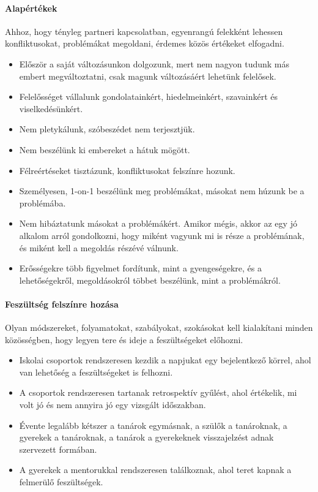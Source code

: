 \paragraph{Alapértékek}
Ahhoz, hogy tényleg partneri kapcsolatban, egyenrangú felekként lehessen konfliktusokat, problémákat megoldani, érdemes közös értékeket elfogadni.
\begin{itemize}
      \item Először a saját változásunkon dolgozunk, mert nem nagyon tudunk más embert megváltoztatni, csak magunk változásáért lehetünk felelősek.
      \item Felelősséget vállalunk gondolatainkért, hiedelmeinkért, szavainkért és viselkedésünkért.
      \item Nem pletykálunk, szóbeszédet nem terjesztjük.
      \item Nem beszélünk ki embereket a hátuk mögött.
      \item Félreértéseket tisztázunk, konfliktusokat felszínre hozunk.
      \item Személyesen, 1-on-1 beszélünk meg problémákat, másokat
        nem\linebreak
        húzunk be a problémába.
      \item Nem hibáztatunk másokat a problémákért. Amikor mégis, akkor az egy jó alkalom arról gondolkozni, hogy miként vagyunk mi is része a problémának, és miként kell a megoldás részévé válnunk.
      \item Erősségekre több figyelmet fordítunk, mint a gyengeségekre, és a lehetőségekről, megoldásokról többet beszélünk, mint a problémákról.
\end{itemize}

\paragraph{Feszültség felszínre hozása}
Olyan módszereket, folyamatokat, szabályokat, szokásokat kell kialakítani minden közösségben, hogy legyen tere és ideje a feszültségeket előhozni.
\begin{itemize}
      \item Iskolai csoportok rendszeresen kezdik a napjukat egy bejelentkező körrel, ahol van lehetőség a feszültségeket is felhozni.
      \item A csoportok rendszeresen tartanak retrospektív gyűlést, ahol értékelik, mi volt jó és nem annyira jó egy vizsgált időszakban.
      \item Évente legalább kétszer a tanárok egymásnak, a szülők a tanároknak, a gyerekek a tanároknak, a tanárok a gyerekeknek visszajelzést adnak szervezett formában.
      \item A gyerekek a mentorukkal rendszeresen találkoznak, ahol teret kapnak a felmerülő feszültségek.
\end{itemize}

